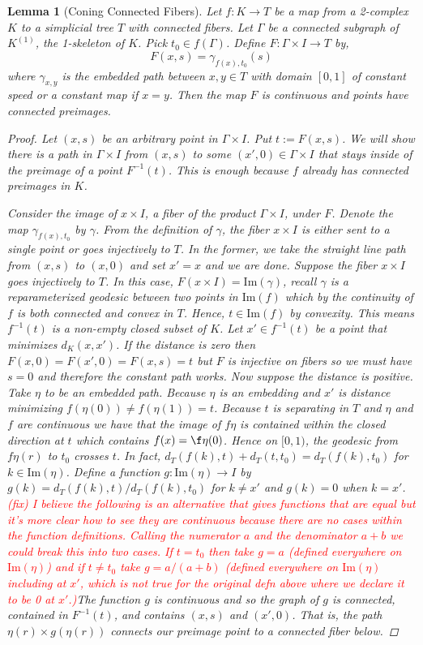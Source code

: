 \documentclass{article}
\newcommand{\fix}[1]{\textcolor{red}{(fix) #1}}
\newcommand{\Imm}{\text{Im}}
\theoremstyle{mystyle}
\newtheorem{lem}[thm]{Lemma}
\theoremstyle{remark}
\begin{document}
\begin{lem}
    [Coning Connected Fibers]
    \label{lem:confib} 
     Let $f:K\to T$ be a map from a 2-complex $K$ to a simplicial tree $T$ with connected fibers. Let $\Gamma$ be a connected subgraph of $K^{(1)}$, the 1-skeleton of $K$. Pick $t_0\in f(\Gamma)$. Define $F:\Gamma\times I\to T$ by,
    \[ F(x,s) = 
            \gamma_{f(x),t_{0}} (s ) 
    \]
    where $\gamma_{x,y}$ is the embedded path between $x,y\in T$ with domain $[0,1]$ of constant speed or a constant map if $x=y$. Then the map $F$ is continuous and points have connected preimages.
    \begin{proof}
        Let $(x,s)$ be an arbitrary point in $\Gamma \times I$. Put $t:=F(x,s)$. We will show there is a path in $\Gamma\times I$ from $(x,s)$ to some $(x',0)\in \Gamma\times I$ that stays inside of the preimage of a point $F^{-1}(t)$. This is enough because $f$ already has connected preimages in $K$.
        
        Consider the image of $x\times I$, a fiber of the product $\Gamma \times I$, under $F$. Denote the map $\gamma_{f(x),t_0}$ by $\gamma$. From the definition of $\gamma$, the fiber $x\times I$ is either sent to a single point or goes injectively to $T$. In the former, we take the straight line path from $(x,s)$ to $(x,0)$ and set $x'=x$ and we are done. Suppose the fiber $x\times I$ goes injectively to $T$. In this case, $F(x\times I) = \Imm(\gamma)$, recall $\gamma$ is a reparameterized geodesic between two points in $\Imm(f)$ which by the continuity of $f$ is both connected and convex in $T$. Hence, $t \in \Imm(f)$ by convexity. This means $f^{-1}(t)$ is a non-empty closed subset of $K$. Let $x'\in f^{-1}(t)$ be a point that minimizes $d_K(x,x')$. If the distance is zero then $F(x,0)=F(x',0)=F(x,s)=t$ but $F$ is injective on fibers so we must have $s=0$ and therefore the constant path works. Now suppose the distance is positive. Take $\eta$ to be an embedded path. Because $\eta$ is an embedding and $x'$ is distance minimizing $f(\eta(0))\neq f(\eta(1))=t$. Because $t$ is separating in $T$ and $\eta$ and $f$ are continuous we have that the image of $f\eta$ is contained within the closed direction at $t$ which contains $f(x)=\f\eta(0)$. Hence on $[0,1)$, the geodesic from $f\eta(r)$ to $t_0$ crosses $t$. In fact, $d_T(f(k), t)+d_T(t, t_0) = d_T(f(k), t_0)$ for $k\in\Imm(\eta)$. Define a function $g:\Imm(\eta)\to I$ by $g(k)=d_T(f(k), t)/d_T(f(k), t_0)$ for $k\neq x'$ and $g(k)=0$ when $k=x'$. \fix{I believe the following is an alternative that gives functions that are equal but it's more clear how to see they are continuous because there are no cases within the function definitions. Calling the numerator $a$ and the denominator $a+b$ we could break this into two cases. If $t=t_0$ then take $g=a$ (defined everywhere on $\Imm(\eta)$) and if $t\neq t_0$ take $g=a/(a+b)$ (defined everywhere on $\Imm(\eta)$ including at $x'$, which is not true for the original defn above where we declare it to be 0 at $x'$.)}The function $g$ is continuous and so the graph of $g$ is connected, contained in $F^{-1}(t)$, and contains $(x,s)$ and $(x',0)$. That is, the path $\eta(r)\times g(\eta(r))$ connects our preimage point to a connected fiber below.
    \end{proof}
\end{lem}
\end{document}
